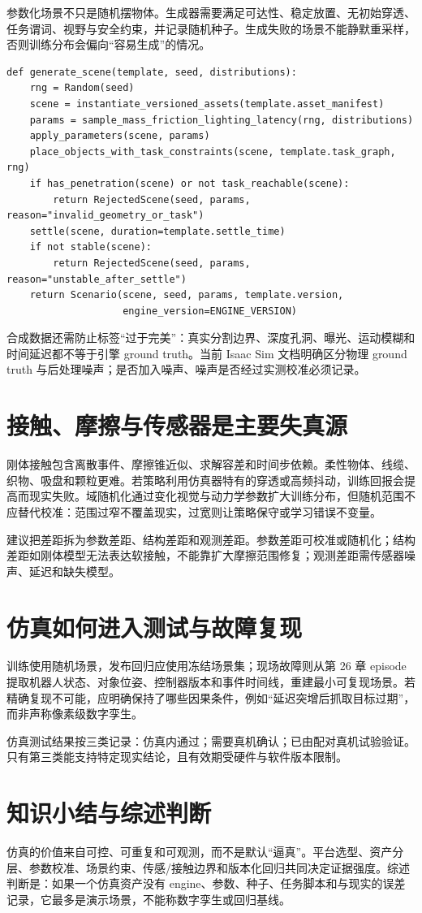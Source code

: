 参数化场景不只是随机摆物体。生成器需要满足可达性、稳定放置、无初始穿透、任务谓词、视野与安全约束，并记录随机种子。生成失败的场景不能静默重采样，否则训练分布会偏向“容易生成”的情况。

\begin{lstlisting}[caption={带约束和 provenance 的场景生成教学伪代码}]
def generate_scene(template, seed, distributions):
    rng = Random(seed)
    scene = instantiate_versioned_assets(template.asset_manifest)
    params = sample_mass_friction_lighting_latency(rng, distributions)
    apply_parameters(scene, params)
    place_objects_with_task_constraints(scene, template.task_graph, rng)
    if has_penetration(scene) or not task_reachable(scene):
        return RejectedScene(seed, params, reason="invalid_geometry_or_task")
    settle(scene, duration=template.settle_time)
    if not stable(scene):
        return RejectedScene(seed, params, reason="unstable_after_settle")
    return Scenario(scene, seed, params, template.version,
                    engine_version=ENGINE_VERSION)
\end{lstlisting}

合成数据还需防止标签“过于完美”：真实分割边界、深度孔洞、曝光、运动模糊和时间延迟都不等于引擎 ground truth。当前 Isaac Sim 文档明确区分物理 ground truth 与后处理噪声\cite{nvidia2026isaacsim}；是否加入噪声、噪声是否经过实测校准必须记录。

\section{接触、摩擦与传感器是主要失真源}

\begingroup
{}
刚体接触包含离散事件、摩擦锥近似、求解容差和时间步依赖。柔性物体、线缆、织物、吸盘和颗粒更难。若策略利用仿真器特有的穿透或高频抖动，训练回报会提高而现实失败。域随机化通过变化视觉与动力学参数扩大训练分布\cite{tobin2017domainrandomization,peng2018dynamicsrandomization}，但随机范围不应替代校准：范围过窄不覆盖现实，过宽则让策略保守或学习错误不变量。
\endgroup

建议把差距拆为参数差距、结构差距和观测差距。参数差距可校准或随机化；结构差距如刚体模型无法表达软接触，不能靠扩大摩擦范围修复；观测差距需传感器噪声、延迟和缺失模型。

\section{仿真如何进入测试与故障复现}

训练使用随机场景，发布回归应使用冻结场景集；现场故障则从第 26 章 episode 提取机器人状态、对象位姿、控制器版本和事件时间线，重建最小可复现场景。若精确复现不可能，应明确保持了哪些因果条件，例如“延迟突增后抓取目标过期”，而非声称像素级数字孪生。

仿真测试结果按三类记录：仿真内通过；需要真机确认；已由配对真机试验验证。只有第三类能支持特定现实结论，且有效期受硬件与软件版本限制。

\section{知识小结与综述判断}

仿真的价值来自可控、可重复和可观测，而不是默认“逼真”。平台选型、资产分层、参数校准、场景约束、传感/接触边界和版本化回归共同决定证据强度。综述判断是：如果一个仿真资产没有 engine、参数、种子、任务脚本和与现实的误差记录，它最多是演示场景，不能称数字孪生或回归基线。
